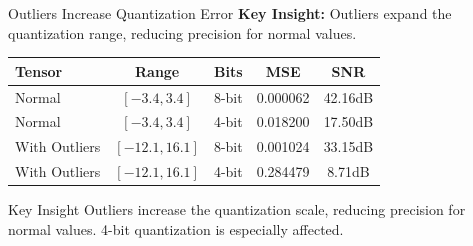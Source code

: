 \documentclass[aspectratio=169,10pt]{beamer}
\begin{document}
\begin{frame}{Outliers Increase Quantization Error}
    \textbf{Key Insight:} Outliers expand the quantization range, reducing precision for normal values.

    \vspace{0.3cm}
    \begin{table}
        \centering
        \small
        \begin{tabular}{lcccc}
            \toprule
            \textbf{Tensor} & \textbf{Range} & \textbf{Bits} & \textbf{MSE} & \textbf{SNR} \\
            \midrule
            Normal & $[-3.4, 3.4]$ & 8-bit & 0.000062 & 42.16dB \\
            Normal & $[-3.4, 3.4]$ & 4-bit & 0.018200 & 17.50dB \\
            With Outliers & $[-12.1, 16.1]$ & 8-bit & 0.001024 & 33.15dB \\
            With Outliers & $[-12.1, 16.1]$ & 4-bit & 0.284479 & 8.71dB \\
            \bottomrule
        \end{tabular}
    \end{table}

    \vspace{0.5cm}
    \begin{block}{Key Insight}
        Outliers increase the quantization scale, reducing precision for normal values. 4-bit quantization is especially affected.
    \end{block}
\end{frame}
\end{document}
